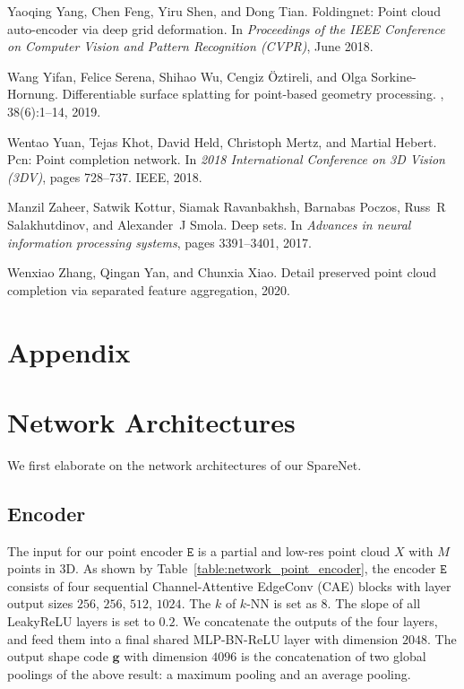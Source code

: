 \documentclass[final]{cvpr}
\begin{document}
{\begin{thebibliography}{10}
Yaoqing Yang, Chen Feng, Yiru Shen, and Dong Tian.
\newblock Foldingnet: Point cloud auto-encoder via deep grid deformation.
\newblock In {\em Proceedings of the IEEE Conference on Computer Vision and
  Pattern Recognition (CVPR)}, June 2018.

Wang Yifan, Felice Serena, Shihao Wu, Cengiz {\"O}ztireli, and Olga
  Sorkine-Hornung.
\newblock Differentiable surface splatting for point-based geometry processing.
, 38(6):1--14, 2019.

Wentao Yuan, Tejas Khot, David Held, Christoph Mertz, and Martial Hebert.
\newblock Pcn: Point completion network.
\newblock In {\em 2018 International Conference on 3D Vision (3DV)}, pages
  728--737. IEEE, 2018.

Manzil Zaheer, Satwik Kottur, Siamak Ravanbakhsh, Barnabas Poczos, Russ~R
  Salakhutdinov, and Alexander~J Smola.
\newblock Deep sets.
\newblock In {\em Advances in neural information processing systems}, pages
  3391--3401, 2017.

Wenxiao Zhang, Qingan Yan, and Chunxia Xiao.
\newblock Detail preserved point cloud completion via separated feature
  aggregation, 2020.

\end{thebibliography}
 
}
\onecolumn 
\appendix

\section*{Appendix}

\section{Network Architectures}
We first elaborate on the network architectures of our SpareNet.

\subsection{Encoder}
The input for our point encoder $\mathtt{E}$ is a partial and low-res point cloud $X$ with $M$ points in 3D.
As shown by Table~\ref{table:network_point_encoder}, the encoder $\mathtt{E}$ consists of four sequential Channel-Attentive EdgeConv (CAE) blocks with layer output sizes $256$, $256$, $512$, $1024$. The $k$ of $k$-NN is set as $8$. The slope of all LeakyReLU layers is set to $0.2$.
We concatenate the outputs of the four layers, and feed them into a final shared MLP-BN-ReLU layer with dimension $2048$. 
The output shape code $\mathbf{g}$ with dimension $4096$ is the concatenation of two global poolings of the above result: a maximum pooling and an average pooling.
\end{document}
